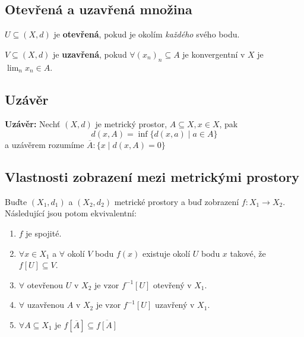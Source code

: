 \documentclass[../main.tex]{subfiles}
\begin{document}
\subsection{Otevřená a uzavřená množina}
\hspace{1.2mm}
$U \subseteq (X,d)$ je \textbf{otevřená}, pokud je okolím \textit{každého} svého bodu.

\vspace{5mm}

\noindent
\hspace{1.2mm}
$V \subseteq (X,d)$ je \textbf{uzavřená}, pokud $\forall (x_n)_n \subseteq A$ je konvergentní
v $X$ je $\lim_n x_n \in A$.

\subsection{Uzávěr}
\hspace{1.2mm}
\textbf{Uzávěr:} Nechť $(X,d)$ je metrický prostor, $A \subseteq X, x\in X$, pak 
\[d(x,A) = \inf\{d(x,a)\mid a \in A\}\]
a uzávěrem rozumíme $\overline{A} : \{x \mid d(x,A) = 0\}$

\subsection{Vlastnosti zobrazení mezi metrickými prostory}
\hspace{1.2mm}
Buďte $(X_1, d_1)$ a $(X_2, d_2)$ metrické prostory a buď zobrazení $f: X_1 \to X_2$. Následující
jsou potom ekvivalentní:
\begin{enumerate}
    \item $f$ je spojité.
    \item $\forall x \in X_1$ a $\forall$ okolí $V$ bodu $f(x)$ existuje okolí $U$ bodu $x$ takové, že
        $f[U] \subseteq V$.
    \item $\forall$ otevřenou $U$ v $X_2$ je vzor $f^{-1}[U]$ otevřený v $X_1$.
    \item $\forall$ uzavřenou $A$ v $X_2$ je vzor $f^{-1}[U]$ uzavřený v $X_1$.
    \item $\forall A \subseteq X_1$ je $f[\overline{A}] \subseteq \overline{f[A]}$
\end{enumerate}


\end{document}

